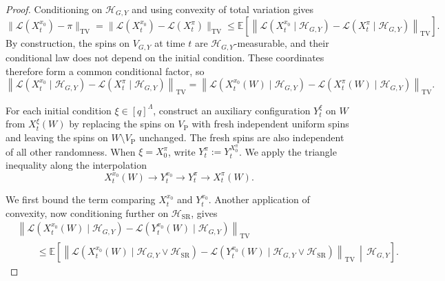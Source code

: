 \documentclass[letterpaper,11pt,reqno]{amsart}
\theoremstyle{definition}
\newcommand{\TV}{\mathrm{TV}}
\newcommand{\Law}{\mathcal L}
\begin{document}
\begin{proof}
Conditioning on \(\mathcal H_{G,Y}\) and using convexity of total variation gives
\[
\bigl\|\Law(X_t^{x_0})-\pi\bigr\|_{\TV}
=
\bigl\|\Law(X_t^{x_0})-\Law(X_t^\pi)\bigr\|_{\TV}
\le
\mathbb E\left[
\left\|
\Law(X_t^{x_0}\mid\mathcal H_{G,Y})
-
\Law(X_t^\pi\mid\mathcal H_{G,Y})
\right\|_{\TV}
\right].
\]
By construction, the spins on $V_{G,Y}$ at time $t$ are \(\mathcal H_{G,Y}\)-measurable, and their conditional law does not depend on the initial condition. These coordinates therefore form a common conditional
factor, so
\[
\left\|
\Law(X_t^{x_0}\mid\mathcal H_{G,Y})
-
\Law(X_t^\pi\mid\mathcal H_{G,Y})
\right\|_{\TV}
=
\left\|
\Law(X_t^{x_0}(W)\mid\mathcal H_{G,Y})
-
\Law(X_t^\pi(W)\mid\mathcal H_{G,Y})
\right\|_{\TV}.
\]


For each initial condition \(\xi\in[q]^\Lambda\), construct an auxiliary
configuration \(Y_t^\xi\) on \(W\) from \(X_t^\xi(W)\) by replacing the spins
on \(V_{\mathrm{P}}\) with fresh independent uniform spins and leaving the
spins on \(W\setminus V_{\mathrm{P}}\) unchanged. The fresh spins are also
independent of all other randomness. When \(\xi=X_0^\pi\), write
\(Y_t^\pi:=Y_t^{X_0^\pi}\).
%
We apply the triangle inequality along the interpolation
\[
X_t^{x_0}(W)
\longrightarrow
Y_t^{x_0}
\longrightarrow
Y_t^\pi
\longrightarrow
X_t^\pi(W).
\]




We first bound the term comparing \(X_t^{x_0}\) and \(Y_t^{x_0}\). Another
application of convexity, now conditioning further on
\(\mathcal H_{\mathrm{SR}}\), gives
\[
\begin{aligned}
&\left\|
\Law(X_t^{x_0}(W)\mid\mathcal H_{G,Y})
-
\Law(Y_t^{x_0}(W)\mid\mathcal H_{G,Y})
\right\|_{\TV} \\
&\qquad\le
\mathbb E\left[
\left\|
\Law(X_t^{x_0}(W)\mid\mathcal H_{G,Y}\vee\mathcal H_{\mathrm{SR}})
-
\Law(Y_t^{x_0}(W)\mid\mathcal H_{G,Y}\vee\mathcal H_{\mathrm{SR}})
\right\|_{\TV}
\,\middle|\,
\mathcal H_{G,Y}
\right].
\end{aligned}
\]




\end{proof}
\end{document}
